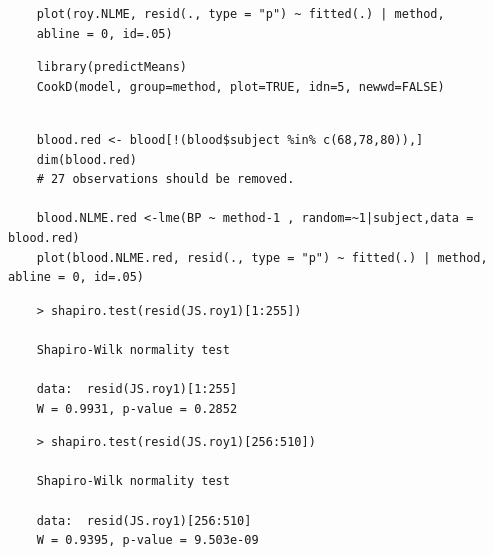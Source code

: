 \documentclass[Main.tex]{subfiles}
\begin{document}
\begin{framed}
	\begin{verbatim}
	plot(roy.NLME, resid(., type = "p") ~ fitted(.) | method, 
	abline = 0, id=.05)
	\end{verbatim}
\end{framed}

\begin{framed}
	\begin{verbatim}
	library(predictMeans)
	CookD(model, group=method, plot=TRUE, idn=5, newwd=FALSE)
	\end{verbatim}
\end{framed}



\begin{framed}
	\begin{verbatim}
	
	blood.red <- blood[!(blood$subject %in% c(68,78,80)),]
	dim(blood.red)
	# 27 observations should be removed.
	
	blood.NLME.red <-lme(BP ~ method-1 , random=~1|subject,data = blood.red)
	plot(blood.NLME.red, resid(., type = "p") ~ fitted(.) | method, abline = 0, id=.05)
	\end{verbatim}
\end{framed}


\begin{framed}
	\begin{verbatim}
	> shapiro.test(resid(JS.roy1)[1:255])
	
	Shapiro-Wilk normality test
	
	data:  resid(JS.roy1)[1:255]
	W = 0.9931, p-value = 0.2852
	\end{verbatim}
\end{framed}

\begin{framed}
	\begin{verbatim}
	> shapiro.test(resid(JS.roy1)[256:510])
	
	Shapiro-Wilk normality test
	
	data:  resid(JS.roy1)[256:510]
	W = 0.9395, p-value = 9.503e-09
	\end{verbatim}
\end{framed}
%		
\end{document}
